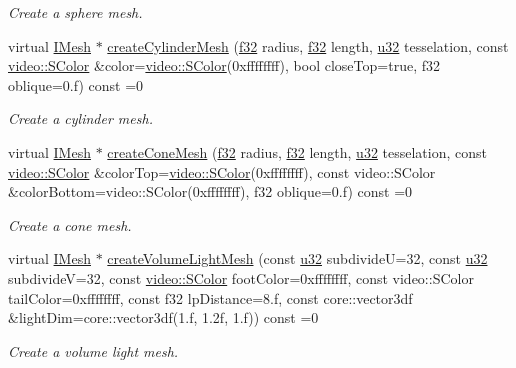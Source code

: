 \begin{DoxyCompactItemize}
\begin{DoxyCompactList}\small\item\em Create a sphere mesh. \end{DoxyCompactList}\item 
virtual \hyperlink{classirr_1_1scene_1_1IMesh}{I\+Mesh} $\ast$ \hyperlink{classirr_1_1scene_1_1IGeometryCreator_a87143de278ac305bc37dc905e800f5f8}{create\+Cylinder\+Mesh} (\hyperlink{namespaceirr_a0277be98d67dc26ff93b1a6a1d086b07}{f32} radius, \hyperlink{namespaceirr_a0277be98d67dc26ff93b1a6a1d086b07}{f32} length, \hyperlink{namespaceirr_a0416a53257075833e7002efd0a18e804}{u32} tesselation, const \hyperlink{classirr_1_1video_1_1SColor}{video\+::\+S\+Color} \&color=\hyperlink{classirr_1_1video_1_1SColor}{video\+::\+S\+Color}(0xffffffff), bool close\+Top=true, f32 oblique=0.\+f) const =0
\begin{DoxyCompactList}\small\item\em Create a cylinder mesh. \end{DoxyCompactList}\item 
virtual \hyperlink{classirr_1_1scene_1_1IMesh}{I\+Mesh} $\ast$ \hyperlink{classirr_1_1scene_1_1IGeometryCreator_af532c8fb5558cf274181eb81220db85b}{create\+Cone\+Mesh} (\hyperlink{namespaceirr_a0277be98d67dc26ff93b1a6a1d086b07}{f32} radius, \hyperlink{namespaceirr_a0277be98d67dc26ff93b1a6a1d086b07}{f32} length, \hyperlink{namespaceirr_a0416a53257075833e7002efd0a18e804}{u32} tesselation, const \hyperlink{classirr_1_1video_1_1SColor}{video\+::\+S\+Color} \&color\+Top=\hyperlink{classirr_1_1video_1_1SColor}{video\+::\+S\+Color}(0xffffffff), const video\+::\+S\+Color \&color\+Bottom=video\+::\+S\+Color(0xffffffff), f32 oblique=0.\+f) const =0
\begin{DoxyCompactList}\small\item\em Create a cone mesh. \end{DoxyCompactList}\item 
virtual \hyperlink{classirr_1_1scene_1_1IMesh}{I\+Mesh} $\ast$ \hyperlink{classirr_1_1scene_1_1IGeometryCreator_a4f4e4a3c266698c375d14c1e19a91407}{create\+Volume\+Light\+Mesh} (const \hyperlink{namespaceirr_a0416a53257075833e7002efd0a18e804}{u32} subdivideU=32, const \hyperlink{namespaceirr_a0416a53257075833e7002efd0a18e804}{u32} subdivideV=32, const \hyperlink{classirr_1_1video_1_1SColor}{video\+::\+S\+Color} foot\+Color=0xffffffff, const video\+::\+S\+Color tail\+Color=0xffffffff, const f32 lp\+Distance=8.\+f, const core\+::vector3df \&light\+Dim=core\+::vector3df(1.\+f, 1.\+2f, 1.\+f)) const =0
\begin{DoxyCompactList}\small\item\em Create a volume light mesh. \end{DoxyCompactList}\item 

\end{DoxyCompactItemize}
